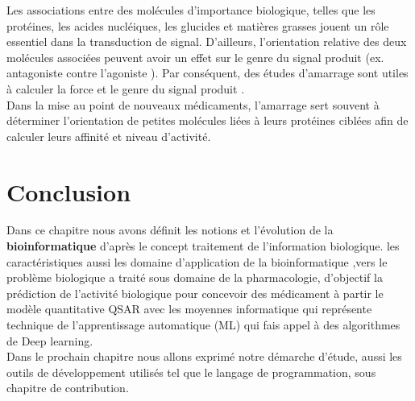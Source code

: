 \documentclass[12pt]{report}
\begin{document}
 Les associations entre des molécules d'importance biologique, telles que les protéines, les acides nucléiques, les glucides et matières grasses jouent un rôle essentiel dans la transduction de signal. D'ailleurs, l'orientation relative des deux molécules associées peuvent avoir un effet sur le genre du signal produit (ex. antagoniste contre l'agoniste ). Par conséquent, des études d'amarrage sont utiles à calculer la force et le genre du signal produit  \cite{ref23} .\\
 Dans la mise au point de nouveaux médicaments, l'amarrage sert souvent à déterminer l'orientation de petites molécules liées à leurs protéines ciblées afin de calculer leurs affinité et niveau d'activité.



\section{Conclusion}
Dans ce chapitre nous avons définit les notions et l'évolution de la \textbf{bioinformatique} d'après le concept traitement de l'information biologique. les caractéristiques aussi les domaine d'application de la bioinformatique ,vers le problème biologique a traité sous domaine de la pharmacologie, d'objectif la prédiction de l'activité biologique pour concevoir des médicament à partir le modèle quantitative QSAR avec les moyennes informatique qui représente technique de l'apprentissage automatique (ML) qui fais appel à des algorithmes de Deep learning.\\
Dans le prochain chapitre nous allons exprimé notre démarche d'étude, aussi les outils de développement  utilisés tel que  le langage de programmation, sous chapitre de contribution.

\newpage


\end{document}
